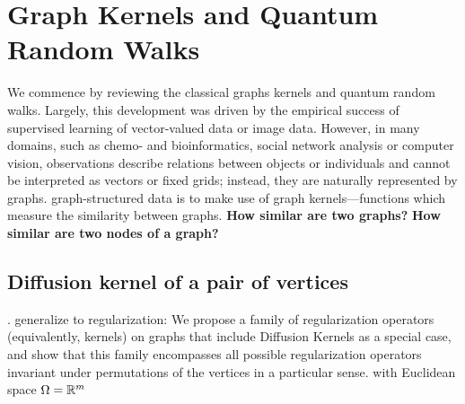 \section{Graph Kernels and Quantum Random Walks}
We commence by reviewing the classical graphs kernels and quantum random walks.
Largely, this development was driven by the empirical success of supervised learning of vector-valued data or image data. However, in many domains, such as chemo- and bioinformatics, social network analysis or computer vision, observations describe relations between objects or individuals and cannot be interpreted as vectors or fixed grids; instead, they are naturally represented by graphs.
\cite{kriegeSurveyGraphKernels2020}
graph-structured data is to make use of graph kernels—functions which measure the similarity between graphs.
\textbf{How similar are two graphs?}
\textbf{How similar are two nodes of a graph?}

\subsection{Diffusion kernel of a pair of vertices}
\cite{kondorDiffusionKernelsGraphs2002}.
generalize to regularization: 
We propose a family of regularization operators (equivalently, kernels) on graphs that include Diffusion Kernels as a special case, and show that this family encompasses all possible regularization operators invariant under permutations of the vertices in a particular sense.
\cite{smolaKernelsRegularizationGraphs2003}
with Euclidean space $\Omega = \mathbb{R}^m$

